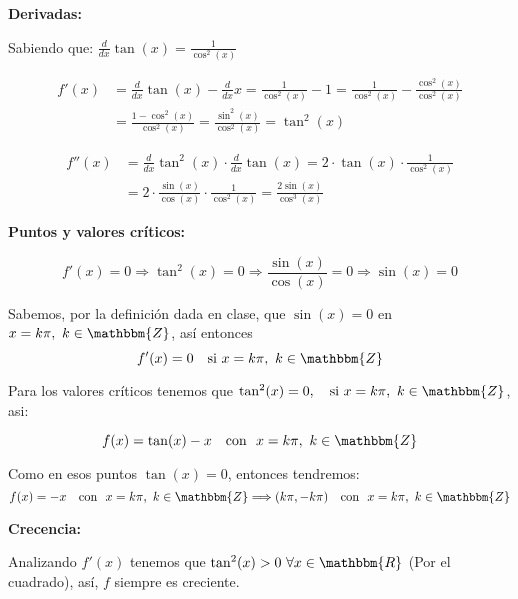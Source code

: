 \documentclass[12pt]{article}
\begin{document}
\begin{enumerate}[\hspace{9px} a)]
        \textbf{Derivadas: }\medskip

            Sabiendo que: \(\displaystyle\frac{d}{dx}\tan(x) = \displaystyle\frac{1}{\cos^2(x)}\)

            \begin{align*}
                f'(x) &= \frac{d}{dx}\tan(x) - \frac{d}{dx}x = \frac{1}{\cos^2(x)} - 1 = \frac{1}{\cos^2(x)} - \frac{\cos^2(x)}{\cos^2(x)} \\
                &= \frac{1-\cos^2(x)}{\cos^2(x)} = \frac{\sin^2(x)}{\cos^2(x)} = \tan^2(x)
            \end{align*}

            \begin{align*}
                f''(x) &= \frac{d}{dx}\tan^2(x)\cdot\frac{d}{dx}\tan(x) = 2\cdot\tan(x)\cdot\frac{1}{\cos^2(x)} \\
                &= 2\cdot\frac{\sin(x)}{\cos(x)}\cdot\frac{1}{\cos^2(x)} = \frac{2\sin(x)}{\cos^3(x)}
            \end{align*}
            
        \textbf{Puntos y valores cr\'iticos: }\medskip

            \begin{equation*}
                f'(x)=0 \Longrightarrow \tan^2(x)=0 \Longrightarrow \frac{\sin(x)}{\cos(x)}=0 \Longrightarrow \sin(x)=0
            \end{equation*}

            Sabemos, por la definici\'on dada en clase, que \(\sin(x)=0\) en \(x=k\pi, \ k\in\mathbbm{Z}\), as\'i entonces 
            \[f'(x)=0 \quad \text{si} \ x=k\pi, \ k\in\mathbbm{Z}\]

            Para los valores cr\'iticos tenemos que \(\tan^2(x)=0, \quad \text{si} \ x=k\pi, \ k\in\mathbbm{Z}\), asi:

            \begin{equation*}
                f(x) = \tan(x)-x \quad \text{con } \  x=k\pi, \ k\in\mathbbm{Z}
            \end{equation*}

            Como en esos puntos \(\tan(x)=0\), entonces tendremos: \[f(x)=-x \quad \text{con } \  x=k\pi, \ k\in\mathbbm{Z} \Longrightarrow (k\pi,-k\pi) \quad \text{con } \  x=k\pi, \ k\in\mathbbm{Z}\]

        \textbf{Crecencia: }\medskip

            Analizando \(f'(x)\) tenemos que \(\tan^2(x)>0 \ \forall x\in\mathbbm{R}\) (Por el cuadrado), as\'i, $f$ siempre es creciente.


\end{enumerate}
\end{document}
